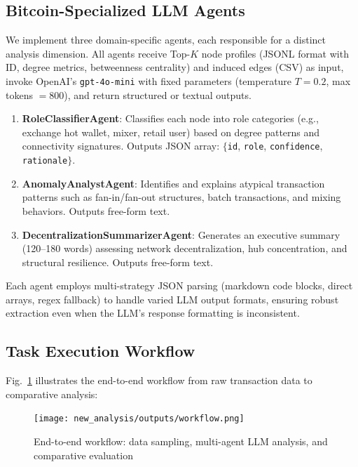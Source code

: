 \subsection{Bitcoin-Specialized LLM Agents}

We implement three domain-specific agents, each responsible for a distinct analysis dimension. All agents receive Top-$K$ node profiles (JSONL format with ID, degree metrics, betweenness centrality) and induced edges (CSV) as input, invoke OpenAI's \texttt{gpt-4o-mini} with fixed parameters (temperature $T{=}0.2$, max tokens ${=}800$), and return structured or textual outputs.

\begin{enumerate}
    \item \textbf{RoleClassifierAgent}: Classifies each node into role categories (e.g., exchange hot wallet, mixer, retail user) based on degree patterns and connectivity signatures. Outputs JSON array: $\{$\texttt{id}, \texttt{role}, \texttt{confidence}, \texttt{rationale}$\}$.
    
    \item \textbf{AnomalyAnalystAgent}: Identifies and explains atypical transaction patterns such as fan-in/fan-out structures, batch transactions, and mixing behaviors. Outputs free-form text.
    
    \item \textbf{DecentralizationSummarizerAgent}: Generates an executive summary (120--180 words) assessing network decentralization, hub concentration, and structural resilience. Outputs free-form text.
\end{enumerate}

Each agent employs multi-strategy JSON parsing (markdown code blocks, direct arrays, regex fallback) to handle varied LLM output formats, ensuring robust extraction even when the LLM's response formatting is inconsistent.

\subsection{Task Execution Workflow}

Fig.~\ref{fig:workflow} illustrates the end-to-end workflow from raw transaction data to comparative analysis:

\begin{figure}[!t]
  \centering
  \texttt{[image: new\_analysis/outputs/workflow.png]}
  \caption{End-to-end workflow: data sampling, multi-agent LLM analysis, and comparative evaluation}
  \label{fig:workflow}
\end{figure}

